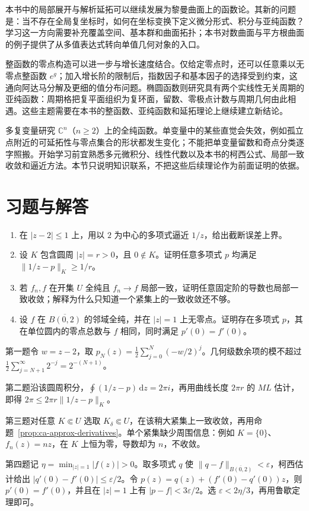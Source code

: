 本书中的局部展开与解析延拓可以继续发展为黎曼曲面上的函数论。其新的问题是：当不存在全局复坐标时，如何在坐标变换下定义微分形式、积分与亚纯函数？学习这一方向需要补充覆盖空间、基本群和曲面拓扑；本书对数曲面与平方根曲面的例子提供了从多值表达式转向单值几何对象的入口。

整函数的零点构造可以进一步与增长速度结合。仅给定零点时，还可以任意乘以无零点整函数 $e^g$；加入增长阶的限制后，指数因子和基本因子的选择受到约束，这通向阿达马分解及更细的值分布问题。椭圆函数则研究具有两个实线性无关周期的亚纯函数：周期格把复平面组织为复环面，留数、零极点计数与周期几何由此相遇。这些主题需要在本书的整函数、亚纯函数和延拓理论上继续建立新结论。

多复变量研究 $\mathbb C^n$（$n\ge2$）上的全纯函数。单变量中的某些直觉会失效，例如孤立点附近的可延拓性与零点集合的形状都发生变化；不能把单变量留数和奇点分类逐字照搬。开始学习前宜熟悉多元微积分、线性代数以及本书的柯西公式、局部一致收敛和逼近方法。本节只说明知识联系，不把这些后续理论作为前面证明的依据。

\section{习题与解答}
\begin{enumerate}
 \item 在 $|z-2|\le1$ 上，用以 $2$ 为中心的多项式逼近 $1/z$，给出截断误差上界。
 \item 设 $K$ 包含圆周 $|z|=r>0$，且 $0\notin K$。证明任意多项式 $p$ 均满足 $\|1/z-p\|_K\ge1/r$。
 \item 若 $f_n,f$ 在开集 $U$ 全纯且 $f_n\to f$ 局部一致，证明任意固定阶的导数也局部一致收敛；解释为什么只知道一个紧集上的一致收敛还不够。
 \item 设 $f$ 在 $\overline{B(0,2)}$ 的邻域全纯，并在 $|z|=1$ 上无零点。证明存在多项式 $p$，其在单位圆内的零点总数与 $f$ 相同，同时满足 $p'(0)=f'(0)$。
\end{enumerate}
\begin{solve}
第一题令 $w=z-2$，取 $p_N(z)=\tfrac12\sum_{j=0}^N(-w/2)^j$。几何级数余项的模不超过
$\tfrac12\sum_{j=N+1}^{\infty}2^{-j}=2^{-(N+1)}$。

第二题沿该圆周积分，$\oint(1/z-p)\,\mathrm dz=2\pi i$，再用曲线长度 $2\pi r$ 的 $ML$ 估计，即得 $2\pi\le2\pi r\|1/z-p\|_K$。

第三题对任意 $K\Subset U$ 选取 $K_\delta\Subset U$，在该稍大紧集上一致收敛，再用命题~\ref{prop:ca-approx-derivatives}。单个紧集缺少周围信息：例如 $K=\{0\}$、$f_n(z)=nz$，在 $K$ 上恒为零，导数却为 $n$，不收敛。

第四题记 $\eta=\min_{|z|=1}|f(z)|>0$。取多项式 $q$ 使 $\|q-f\|_{\overline{B(0,2)}}<\varepsilon$，柯西估计给出 $|q'(0)-f'(0)|\le\varepsilon/2$。令 $p(z)=q(z)+(f'(0)-q'(0))z$，则 $p'(0)=f'(0)$，并且在 $|z|=1$ 上有 $|p-f|<3\varepsilon/2$。选 $\varepsilon<2\eta/3$，再用鲁歇定理即可。
\end{solve}

